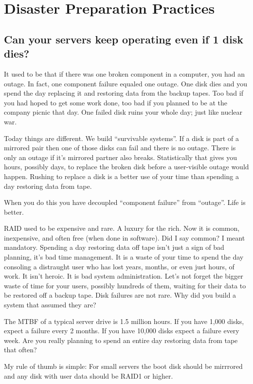 \documentclass{article}
\begin{document}
\section{Disaster Preparation Practices}
\subsection{Can your servers keep operating even if 1 disk dies?}
It used to be that if there was one broken component in a computer, you had an outage. In fact, one component failure equaled one outage. One disk dies and you spend the day replacing it and restoring data from the backup tapes. Too bad if you had hoped to get some work done, too bad if you planned to be at the company picnic that day. One failed disk ruins your whole day; just like nuclear war.

Today things are different. We build ``survivable systems''. If a disk is part of a mirrored pair then one of those disks can fail and there is no outage. There is only an outage if it's mirrored partner also breaks. Statistically that gives you hours, possibly days, to replace the broken disk before a user-visible outage would happen. Rushing to replace a disk is a better use of your time than spending a day restoring data from tape.

When you do this you have decoupled ``component failure'' from ``outage''. Life is better.

RAID used to be expensive and rare. A luxury for the rich. Now it is common, inexpensive, and often free (when done in software). Did I say common? I meant mandatory. Spending a day restoring data off tape isn't just a sign of bad planning, it's bad time management. It is a waste of your time to spend the day consoling a distraught user who has lost years, months, or even just hours, of work. It isn't heroic. It is bad system administration. Let's not forget the bigger waste of time for your users, possibly hundreds of them, waiting for their data to be restored off a backup tape. Disk failures are not rare. Why did you build a system that assumed they are?

The MTBF of a typical server drive is 1.5 million hours. If you have 1,000 disks, expect a failure every 2 months. If you have 10,000 disks expect a failure every week. Are you really planning to spend an entire day restoring data from tape that often?

My rule of thumb is simple: For small servers the boot disk should be mirrrored and any disk with user data should be RAID1 or higher.
\end{document}
